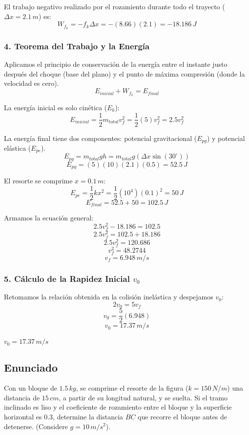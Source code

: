 \documentclass[12pt, a4paper]{article}
\begin{document}
El trabajo negativo realizado por el rozamiento durante todo el trayecto ($\Delta x = 2.1 \, \si{m}$) es:
$$ W_{f_k} = -f_k \Delta x = -(8.66)(2.1) = -18.186 \, \si{J} $$

\subsubsection*{4. Teorema del Trabajo y la Energía}
Aplicamos el principio de conservación de la energía entre el instante justo después del choque (base del plano) y el punto de máxima compresión (donde la velocidad es cero).
$$ E_{inicial} + W_{f_k} = E_{final} $$

La energía inicial es solo cinética ($E_k$):
$$ E_{inicial} = \frac{1}{2} m_{total} v_f^2 = \frac{1}{2} (5) v_f^2 = 2.5 v_f^2 $$

La energía final tiene dos componentes: potencial gravitacional ($E_{pg}$) y potencial elástica ($E_{pe}$).
$$ E_{pg} = m_{total} g h = m_{total} g (\Delta x \sin(30^\circ)) $$
$$ E_{pg} = (5)(10)(2.1)(0.5) = 52.5 \, \si{J} $$

El resorte se comprime $x = 0.1 \, \si{m}$:
$$ E_{pe} = \frac{1}{2} k x^2 = \frac{1}{2} (10^4) (0.1)^2 = 50 \, \si{J} $$
$$ E_{final} = 52.5 + 50 = 102.5 \, \si{J} $$

Armamos la ecuación general:
$$ 2.5 v_f^2 - 18.186 = 102.5 $$
$$ 2.5 v_f^2 = 102.5 + 18.186 $$
$$ 2.5 v_f^2 = 120.686 $$
$$ v_f^2 = 48.2744 $$
$$ v_f = 6.948 \, \si{m/s} $$

\subsubsection*{5. Cálculo de la Rapidez Inicial $v_0$}
Retomamos la relación obtenida en la colisión inelástica y despejamos $v_0$:
$$ 2 v_0 = 5 v_f $$
$$ v_0 = \frac{5}{2} (6.948) $$
$$ v_0 = 17.37 \, \si{m/s} $$

\begin{tcolorbox}[colback=green!5!white, colframe=green!50!black, title=Respuesta Final]
\centering \Large $v_0 = 17.37 \, \si{m/s}$
\end{tcolorbox}

\newpage

\subsection*{Enunciado}
Con un bloque de $1.5 \, \si{kg}$, se comprime el resorte de la figura ($k = 150 \, \si{N/m}$) una distancia de $15 \, \si{cm}$, a partir de su longitud natural, y se suelta. Si el tramo inclinado es liso y el coeficiente de rozamiento entre el bloque y la superficie horizontal es $0.3$, determine la distancia $BC$ que recorre el bloque antes de detenerse. (Considere $g = 10 \, \si{m/s^2}$).
\end{document}
